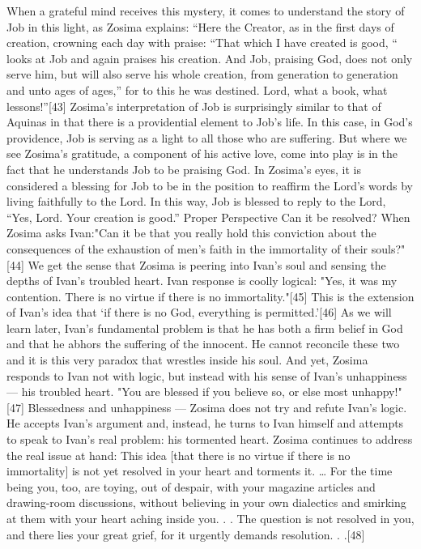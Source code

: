 When a grateful mind receives this mystery, it comes to understand the story of Job in this light, as Zosima explains: “Here the Creator, as in the first days of creation, crowning each day with praise: “That which I have created is good, “ looks at Job and again praises his creation. And Job, praising God, does not only serve him, but will also serve his whole creation, from generation to generation and unto ages of ages,” for to this he was destined. Lord, what a book, what lessons!”[43] Zosima’s interpretation of Job is surprisingly similar to that of Aquinas in that there is a providential element to Job’s life. In this case, in God’s providence, Job is serving as a light to all those who are suffering. But where we see Zosima’s gratitude, a component of his active love, come into play is in the fact that he understands Job to be praising God. In Zosima’s eyes, it is considered a blessing for Job to be in the position to reaffirm the Lord’s words by living faithfully to the Lord. In this way, Job is blessed to reply to the Lord, “Yes, Lord. Your creation is good.”
Proper Perspective
Can it be resolved?
When Zosima asks Ivan:"Can it be that you really hold this conviction about the consequences of the exhaustion of men's faith in the immortality of their souls?"[44] We get the sense that Zosima is peering into Ivan's soul and sensing the depths of Ivan's troubled heart. Ivan response is coolly logical: "Yes, it was my contention. There is no virtue if there is no immortality."[45] This is the extension of Ivan’s idea that ‘if there is no God, everything is permitted.'[46] As we will learn later, Ivan's fundamental problem is that he has both a firm belief in God and that he abhors the suffering of the innocent. He cannot reconcile these two and it is this very paradox that wrestles inside his soul. And yet, Zosima responds to Ivan not with logic, but instead with his sense of Ivan's unhappiness — his troubled heart.
"You are blessed if you believe so, or else most unhappy!"[47] Blessedness and unhappiness — Zosima does not try and refute Ivan's logic. He accepts Ivan's argument and, instead, he turns to Ivan himself and attempts to speak to Ivan's real problem: his tormented heart. Zosima continues to address the real issue at hand: 
This idea [that there is no virtue if there is no immortality] is not yet resolved in your heart and torments it. … For the time being you, too, are toying, out of despair, with your magazine articles and drawing-room discussions, without believing in your own dialectics and smirking at them with your heart aching inside you. . . The question is not resolved in you, and there lies your great grief, for it urgently demands resolution. . .[48]
